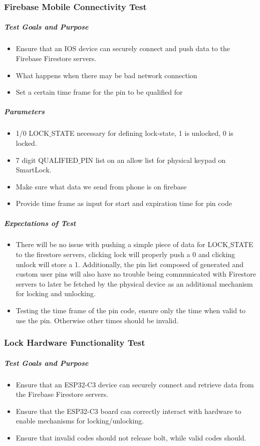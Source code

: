 \documentclass[a4paper,12pt]{article}
\begin{document}
\subsubsection*{Firebase Mobile Connectivity Test}
\subparagraph{Test Goals and Purpose}
\begin{itemize}
    \item Ensure that an IOS device can securely connect and push data to the Firebase Firestore servers.
    \item What happens when there may be bad network connection
    \item Set a certain time frame for the pin to be qualified for
\end{itemize}

\subparagraph{Parameters}
\begin{itemize}
    \item 1/0 LOCK$\_$STATE necessary for defining lock-state, 1 is unlocked, 0 is locked.
    \item 7 digit QUALIFIED$\_$PIN list on an allow list for physical keypad on SmartLock.
    \item Make sure what data we send from phone is on firebase
    \item Provide time frame as input for start and expiration time for pin code
\end{itemize}

\subparagraph{Expectations of Test}
\begin{itemize}
    \item There will be no issue with pushing a simple piece of data for LOCK$\_$STATE to the firestore servers, clicking lock will properly push a 0 and clicking unlock will store a 1. Additionally, the pin list composed of generated and custom user pins will also have no trouble being communicated with Firestore servers to later be fetched by the physical device as an additional mechanism for locking and unlocking.
    \item Testing the time frame of the pin code, ensure only the time when valid to use the pin. Otherwise other times should be invalid.
\end{itemize}

\subsubsection{Lock Hardware Functionality Test}
\subparagraph{Test Goals and Purpose}
\begin{itemize}
    \item Ensure that an ESP32-C3 device can securely connect and retrieve data from the Firebase Firestore servers.
    \item Ensure that the ESP32-C3 board can correctly interact with hardware to enable mechanisms for locking/unlocking.
    \item Ensure that invalid codes should not release bolt, while valid codes should.
\end{itemize}
\end{document}
